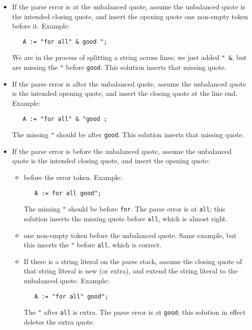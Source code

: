 \documentclass{article}
\begin{document}
\begin{itemize}
\item If the parse error is at the unbalanced quote, assume the unbalanced
quote is the intended closing quote, and insert the opening quote one
non-empty token before it. Example:
\begin{verbatim}
   A := "for all" & good ";
\end{verbatim}
We are in the process of splitting a string across lines; we just
added \verb|" &|, but are missing the \verb|"| before \verb|good|.
This solution inserts that missing quote.

\item If the parse error is after the unbalanced quote, assume the unbalanced
quote is the intended opening quote, and insert the closing quote at
the line end. Example:
\begin{verbatim}
   A := "for all" & "good ;
\end{verbatim}
The missing \verb|"| should be after \verb|good|.
This solution inserts that missing quote.

\item If the parse error is before the unbalanced quote, assume the unbalanced
quote is the intended closing quote, and insert the opening quote:

\begin{itemize}
\item before the error token. Example:
\begin{verbatim}
   A := for all good";
\end{verbatim}
The missing \verb|"| should be before \verb|for|. The parse error is at \verb|all|;
this solution inserts the missing quote before \verb|all|, which is
almost right.

\item one non-empty token before the unbalanced quote. Same example,
  but this inserts the \verb|"| before \verb|all|, which is correct.

\item If there is a string literal on the parse stack,
assume the closing quote of that string literal is new (or extra),
and extend the string literal to the unbalanced quote. Example:
\begin{verbatim}
   A := "for all" good";
\end{verbatim}
The \verb|"| after \verb|all| is extra. The parse error is at \verb|good|;
this solution in effect deletes the extra quote.
\end{itemize}
\end{itemize}
\end{document}
